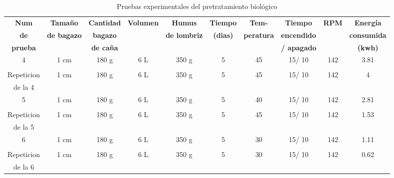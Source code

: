 \documentclass[12pt]{article}
\begin{document}
				\begin{table}[H]
				\centering
				\caption{Pruebas experimentales del pretratamiento biológico}
				\label{diagrama biologico3}
				\resizebox{16cm}{!} {
					\begin{tabular}{|c|c|c|c|c|c|c|c|c|c|   }
						\hline
				\textbf{Num} & \textbf{Tamaño } & \textbf{Cantidad } & \textbf{Volumen} & \textbf{Humus} & \textbf{Tiempo} & \textbf{Tem-} & \textbf{Tiempo} & \textbf{RPM}& \textbf{Energía} \\
						\textbf{de}& \textbf{ de bagazo} & \textbf{ bagazo} & & \textbf{de lombriz} & \textbf{(dias)} & \textbf{peratura}&  \textbf{ encendido}& & \textbf{consumida} \\
						
					\textbf{prueba}	& &  \textbf{ de caña} & &  &  &  &\textbf{ / apagado} & & \textbf{(kwh)}  \\
						
						
						\hline
						
						4 & 1 cm & 180 g & 6 L & 350 g & 5 & 45 & 15/ 10 &    142 &3.81 \\
						& & &  & &  &   &  &  &\\	\hline
						
						Repeticion & 1 cm & 180 g & 6 L & 350 g & 5 & 45 & 15/ 10&  142 & 4 \\
						de la 4&  & &  & &  &   &  & & \\	\hline
						
						5 & 1 cm & 180 g & 6 L & 350 g & 5 & 40 & 15/ 10 &   142  &2.81\\  
						& & &  & &  &   &  & & \\	\hline
						
						Repeticion & 1 cm & 180 g & 6 L & 350 g & 5 & 45 & 15/ 10 &  142 & 1.53 \\
						de la 5&  & &  & &  &   &  & & \\	\hline
						
						6 & 1 cm & 180 g & 6 L & 350 g & 5 & 30 & 15/ 10 &   142  & 1.11 \\  
						& & &  & &  &   &  & & \\	
						\hline
						
						Repeticion & 1 cm    & 180 g & 6 L & 350 g & 5 & 30 & 15/ 10 &  142 & 0.62 \\
						de la 6    &  &       &      &      &   &    &    &     & \\	\hline
					\end{tabular}
				}
				
			\end{table}
			
\end{document}
